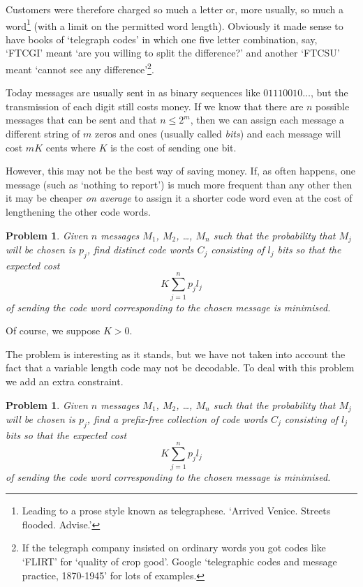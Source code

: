 \documentclass[12pt,a4paper]{article}
\theoremstyle{plain}
\newtheorem{problem}[theorem]{Problem}
\theoremstyle{definition}
\begin{document}
Customers were therefore charged so much
a letter or, more usually, so 
much a word\footnote{Leading to a
prose style known as telegraphese.
`Arrived Venice. Streets flooded. Advise.'}
(with a limit
on the permitted word length).
Obviously it made sense to have books
of `telegraph codes' in which one five letter
combination, say, `FTCGI'
meant `are you willing to split the difference?'
and  another `FTCSU' meant
`cannot see any difference'\footnote{If the telegraph
company insisted on ordinary words you got
codes like `FLIRT' for `quality of crop good'.
Google `telegraphic codes and message practice, 1870-1945'
for lots of examples.}.
 
Today messages are usually sent in
as binary sequences like $01110010\dots$,
but the transmission of each digit still costs
money. If we know that there are $n$ possible
messages that can be sent and that $n\leq 2^{m}$,
then we can assign each message a different
string of $m$ zeros and ones (usually called \emph{bits})
and each message will cost $mK$ cents where $K$
is the cost of sending one bit.

However, this may not be the best way of saving money.
If, as  often happens, one message 
(such as `nothing to report') is much more frequent
than any other then it may be cheaper \emph{on average}
to assign it a shorter code word even at the cost
of lengthening the other code words.
\begin{problem}\label{P;Compress one}
Given $n$ messages $M_{1}$, $M_{2}$,
\dots, $M_{n}$ such that the probability that $M_{j}$
will be chosen is $p_{j}$, find distinct code words $C_{j}$
consisting of $l_{j}$ bits so that the expected cost
\[K\sum_{j=1}^{n}p_{j}l_{j}\]
of sending the code word corresponding to the chosen
message is minimised.
\end{problem}
Of course, we suppose $K>0$.

The problem is interesting as it stands, but we
have not taken into account the fact that a variable
length code may not be decodable. To deal with this
problem we add an extra constraint.
\begin{problem}\label{P;Compress}
Given $n$ messages $M_{1}$, $M_{2}$,
\dots, $M_{n}$ such that the probability that $M_{j}$
will be chosen is $p_{j}$, find a prefix-free
collection of code words $C_{j}$
consisting of $l_{j}$ bits so that the expected cost
\[K\sum_{j=1}^{n}p_{j}l_{j}\]
of sending the code word corresponding to the chosen
message is minimised.
\end{problem}
\end{document}
